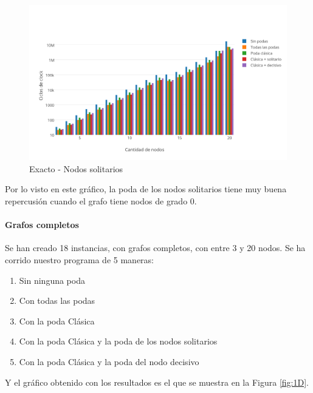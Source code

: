 \begin{figure}[htb]
	\begin{center}
    		\includegraphics[scale=0.8]{imagenes/exacto-solitarios.png}
	\end{center}
	\caption{Exacto - Nodos solitarios}\label{fig:1C}
\end{figure}

Por lo visto en este gráfico, la poda de los nodos solitarios tiene muy buena repercusión cuando el grafo tiene nodos de grado 0.

\paragraph{Grafos completos} 

Se han creado 18 instancias, con grafos completos, con entre 3 y 20 nodos. Se ha corrido nuestro programa de 5 maneras:

\begin{enumerate}
	\item Sin ninguna poda
	\item Con todas las podas 
	\item Con la poda Clásica
	\item Con la poda Clásica y la poda de los nodos solitarios
	\item Con la poda Clásica y la poda del nodo decisivo
\end{enumerate}

Y el gráfico obtenido con los resultados es el que se muestra en la Figura \ref{fig:1D}.

